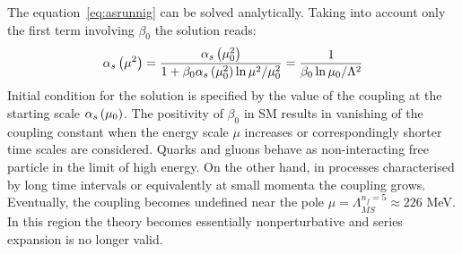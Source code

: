 The equation~\ref{eq:asrunnig} can be solved analytically. Taking into account only the first term involving $\beta_0$ the solution reads:
\begin{equation}
 \mbox{$\alpha_{s}$}\left(\mu^2\right) = \dfrac{ \mbox{$\alpha_{s}$}\left(\mu_0^2\right) }{1+\beta_0\mbox{$\alpha_{s}$}\left(\mu_0^2\right)\ln{\mu^2/\mu_0^2}} = \dfrac{1}{\beta_0\ln{\mu_0/\Lambda^2}}
\label{eq:asrunnigsolution}
\end{equation}
Initial condition for the solution is specified by the value of the coupling at the starting scale $\mbox{$\alpha_{s}$}\left(\mu_0\right)$. The positivity of $\beta_0$ in SM results in vanishing of the coupling constant when the energy scale $\mu$ increases or correspondingly shorter time scales are considered. Quarks and gluons behave as non-interacting free particle in the limit of high energy. On the other hand, in processes characterised by long time intervals or equivalently at small momenta the coupling grows. Eventually, the coupling becomes undefined near the pole $\mu = \Lambda_{\overline{MS}}^{n_f=5} \approx 226$ MeV. In this region the theory becomes essentially nonperturbative and series expansion is no longer valid. 

